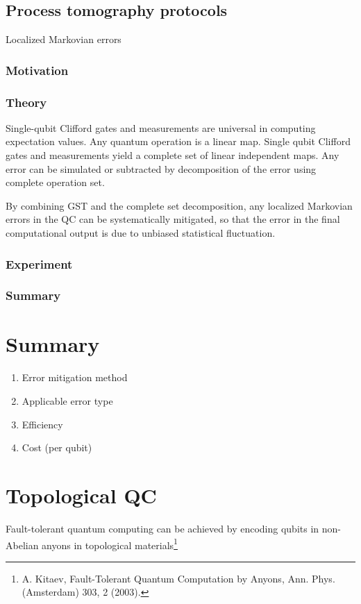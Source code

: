 \documentclass[11pt, oneside]{article}   	%
\begin{document}
\subsection{Process tomography protocols}
Localized Markovian errors
\subsubsection{Motivation}
\subsubsection{Theory}
Single-qubit Clifford gates and measurements are universal in  computing expectation values.
Any quantum operation is a linear map.
Single qubit Clifford gates and measurements yield a complete set of linear independent maps.
Any error can be simulated or subtracted by decomposition of the error using complete operation set.

By combining GST and the complete set decomposition, any localized Markovian errors in the QC can be systematically mitigated, 
so that the error in the final computational output is due to unbiased statistical fluctuation.

\subsubsection{Experiment}
\subsubsection{Summary}

\section{Summary}
\begin{enumerate}
\item {Error mitigation method}
\item {Applicable error type}
\item {Efficiency}
\item {Cost (per qubit)}
\end{enumerate}

\appendix
\section{Topological QC}
Fault-tolerant quantum computing can be achieved by encoding qubits in non-Abelian anyons in topological materials\footnote{A. Kitaev, Fault-Tolerant Quantum Computation by Anyons, Ann. Phys. (Amsterdam) 303, 2 (2003).}
\end{document}

